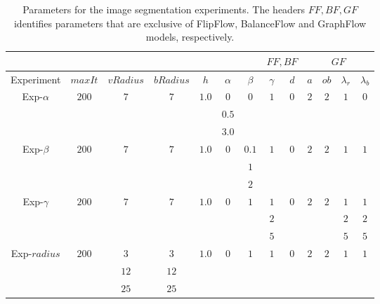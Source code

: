 \begin{table}
\centering
\begin{tabular}{|c|c|c|c|c|c|c|c|c|c|c|c|c|}
\cline{8-13}
\multicolumn{7}{c|}{} & \multicolumn{2}{|c|}{$FF,BF$} & \multicolumn{4}{|c|}{$GF$}\\
\hline
Experiment & $maxIt$ & $vRadius$ & $bRadius$ & $h$ & $\alpha$ & $\beta$  & $\gamma$ & $d$ & $a$ & $ob$ & $\lambda_r$ & $\lambda_b$ \\
\hline
\multirow{3}{*}{Exp-$\alpha$} & \multirow{3}{*}{$200$} & \multirow{3}{*}{$7$} & \multirow{3}{*}{$7$} & \multirow{3}{*}{$1.0$} & $0$ & \multirow{3}{*}{$0$} & \multirow{3}{*}{$1$} & \multirow{3}{*}{$0$} & \multirow{3}{*}{$2$} & \multirow{3}{*}{$2$} & \multirow{3}{*}{$1$} & \multirow{3}{*}{$0$} \\
&  & & & & $0.5$ & & & & & & &\\
&  & & & & $3.0$ & & & & & & &\\
\hline
\multirow{3}{*}{Exp-$\beta$} & \multirow{3}{*}{$200$} & \multirow{3}{*}{$7$} & \multirow{3}{*}{$7$} & \multirow{3}{*}{$1.0$} & \multirow{3}{*}{$0$} & $0.1$ & \multirow{3}{*}{$1$} & \multirow{3}{*}{$0$} & \multirow{3}{*}{$2$} & \multirow{3}{*}{$2$} & \multirow{3}{*}{$1$} & \multirow{3}{*}{$1$} \\
&  & & & & & $1$ & & & & & &\\
&  & & & & & $2$ & & & & & &\\
\hline
\multirow{3}{*}{Exp-$\gamma$} & \multirow{3}{*}{$200$} & \multirow{3}{*}{$7$} & \multirow{3}{*}{$7$} & \multirow{3}{*}{$1.0$} & \multirow{3}{*}{$0$} & \multirow{3}{*}{$1$} & $1$ & \multirow{3}{*}{$0$} & \multirow{3}{*}{$2$} & \multirow{3}{*}{$2$} & $1$ & $1$ \\
&  & & & & & & $2$ & & & & $2$ & $2$\\
&  & & & & & & $5$ & & & & $5$ & $5$\\
\hline
\multirow{3}{*}{Exp-$radius$} & \multirow{3}{*}{$200$} & $3$ & $3$ & \multirow{3}{*}{$1.0$} &  \multirow{3}{*}{$0$} & \multirow{3}{*}{$1$} & \multirow{3}{*}{$1$} & \multirow{3}{*}{$0$} & \multirow{3}{*}{$2$} & \multirow{3}{*}{$2$} & \multirow{3}{*}{$1$} & \multirow{3}{*}{$1$} \\
&  & $12$ & $12$ & & & & & & & & & \\
&  & $25$ & $25$ & & & & & & & & & \\
\hline
\end{tabular}
\caption{Parameters for the image segmentation experiments. The headers $FF,BF,GF$ identifies parameters that are exclusive of FlipFlow, BalanceFlow and GraphFlow models, respectively.}
\label{tab:image-segmentation-parameters-summary}
\end{table}


